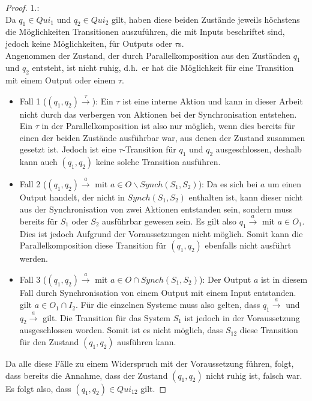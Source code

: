 \begin{proof}
  1.:\\
  Da $q_1\in Qui_1$ und $q_2\in Qui_2$ gilt, haben
  diese beiden Zustände jeweils höchstens die Möglichkeiten Transitionen
  auszuführen, die mit Inputs beschriftet sind, jedoch keine Möglichkeiten, für
  Outputs oder $\tau$s.\\
  Angenommen der Zustand, der durch Parallelkomposition aus den Zuständen $q_1$
  und $q_2$ entsteht, ist nicht ruhig, d.h.\ er hat die Möglichkeit für eine
  Transition mit einem Output oder einem $\tau$.
  \begin{itemize}
    \item Fall 1 ($(q_1,q_2) \overset{\tau}{\rightarrow}$): Ein $\tau$ ist eine
      interne Aktion und kann in dieser Arbeit nicht durch das verbergen von
      Aktionen bei der Synchronisation entstehen. Ein $\tau$ in der
      Parallelkomposition ist also nur möglich, wenn dies bereits für einen der
      beiden Zustände ausführbar war, aus denen der Zustand zusammen gesetzt
      ist. Jedoch ist eine $\tau$-Transition für $q_1$ und $q_2$
      ausgeschlossen, deshalb kann auch $(q_1,q_2)$ keine solche Transition
      ausführen.
    \item Fall 2 ($(q_1,q_2) \overset{a}{\rightarrow}$ mit $a\in O\backslash
      Synch(S_1,S_2)$): Da es sich bei $a$ um einen Output handelt, der nicht
      in $Synch(S_1,S_2)$ enthalten ist, kann dieser nicht aus der
      Synchronisation von zwei Aktionen entstanden sein, sondern muss bereits
      für $S_1$ oder $S_2$ ausführbar gewesen sein. Es gilt also \oBdA{} $q_1
      \overset{a}{\rightarrow}$ mit $a\in O_1$. Dies ist jedoch Aufgrund der
      Voraussetzungen nicht möglich. Somit kann die Parallelkomposition
      diese Transition für $(q_1,q_2)$ ebenfalls nicht ausführt werden.
    \item Fall 3 ($(q_1,q_2) \overset{a}{\rightarrow}$ mit $a\in O\cap
      Synch(S_1,S_2)$): Der Output $a$ ist in diesem Fall durch Synchronisation
      von einem Output mit einem Input entstanden. \OBdA{} gilt $a\in O_1\cap
      I_2$. Für die einzelnen Systeme muss also gelten, dass $q_1
      \overset{a}{\rightarrow}$ und $q_2 \overset{a}{\rightarrow}$ gilt. Die
      Transition für das System $S_1$ ist jedoch in der Voraussetzung
      ausgeschlossen worden. Somit ist es nicht möglich, dass $S_{12}$ diese
      Transition für den Zustand $(q_1,q_2)$ ausführen kann.
  \end{itemize}
  Da alle diese Fälle zu einem Widerspruch mit der Voraussetzung führen, folgt,
  dass bereits die Annahme, dass der Zustand $(q_1,q_2)$ nicht ruhig ist,
  falsch war. Es folgt also, dass $(q_1,q_2)\in Qui_{12}$ gilt.


\end{proof}
